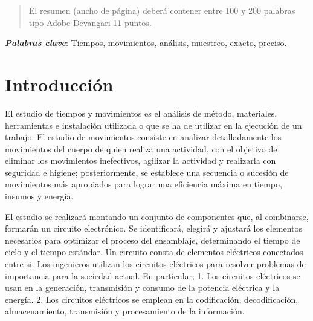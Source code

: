     \maketitle
    \thispagestyle{fancy}
    
    
    
    \begin{abstract}
    \noindent 
    El resumen (ancho de página) deberá contener entre 100 y 200 palabras tipo Adobe Devangari 11 puntos.
    
    \end{abstract}
    \textbf{\textit{Palabras clave}}: {Tiempos, movimientos, análisis, muestreo, exacto, preciso.}
    
    \section{Introducción}
    
    El estudio de tiempos y movimientos es el análisis de método, materiales, herramientas e instalación utilizada o que se ha de utilizar en la ejecución de un trabajo.
    El estudio de movimientos consiste en analizar detalladamente los movimientos del cuerpo de quien realiza una actividad, con el objetivo de eliminar los movimientos inefectivos, agilizar la actividad y realizarla con seguridad e higiene; posteriormente, se establece una secuencia o sucesión de movimientos más apropiados para lograr una eficiencia máxima en tiempo, insumos y energía.
    
    El estudio se realizará montando un conjunto de componentes que, al combinarse, formarán un circuito electrónico. Se identificará, elegirá y ajustará los elementos necesarios para optimizar el proceso del ensamblaje, determinando el tiempo de ciclo y el tiempo estándar. 
    Un circuito consta de elementos eléctricos conectados entre si. Los ingenieros utilizan los circuitos eléctricos para resolver problemas de importancia para la sociedad actual. En particular;
    1. Los circuitos eléctricos se usan en la generación, transmisión y consumo de la potencia eléctrica y la energía.
    2. Los circuitos eléctricos se emplean en la codificación, decodificación, almacenamiento, transmisión y procesamiento de la información.
    
